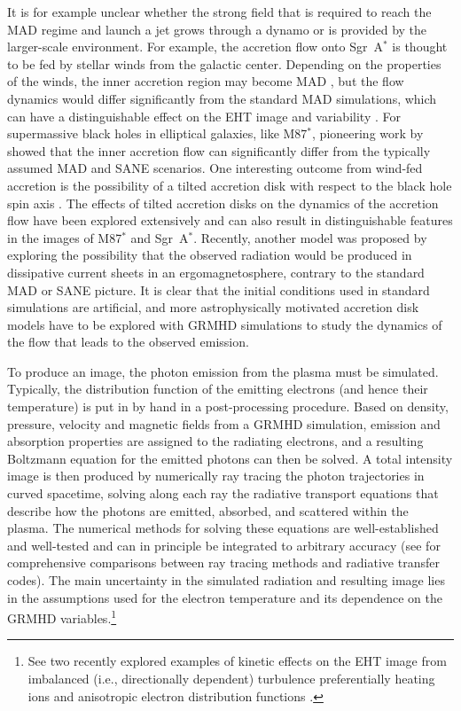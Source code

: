 \documentclass[graybox,envcountchap]{svmult}
\begin{document}
It is for example unclear whether the strong field that is required to reach the MAD regime and launch a jet grows through a dynamo \cite{Liska2020,JacqueminIde2023} or is provided by the larger-scale environment.
For example, the accretion flow onto Sgr~A$^*$ is thought to be fed by stellar winds from the galactic center.
Depending on the properties of the winds, the inner accretion region may become MAD \cite{Ressler2020}, but the flow dynamics would differ significantly from the standard MAD simulations, which can have a distinguishable effect on the EHT image and variability \cite{Jia2022,Murchikova2022}.
For supermassive black holes in elliptical galaxies, like M87$^*$, pioneering work by \cite{Guo2023} showed that the inner accretion flow can significantly differ from the typically assumed MAD and SANE scenarios.
One interesting outcome from wind-fed accretion is the possibility of a tilted accretion disk with respect to the black hole spin axis \cite{Ressler2023}.
The effects of tilted accretion disks on the dynamics of the accretion flow have been explored extensively \cite{Chatterjee2020,White2020,White2022,Chatterjee2023} and can also result in distinguishable features in the images of M87$^*$ and Sgr~A$^*$.
Recently, another model was proposed by \cite{Blandford2022} exploring the possibility that the observed radiation would be produced in dissipative current sheets in an ergomagnetosphere, contrary to the standard MAD or SANE picture.
It is clear that the initial conditions used in standard simulations are artificial, and more astrophysically motivated accretion disk models have to be explored with GRMHD simulations to study the dynamics of the flow that leads to the observed emission.

\bigskip

To produce an image, the photon emission from the plasma must be simulated.
Typically, the distribution function of the emitting electrons (and hence their temperature) is put in by hand in a post-processing procedure.
Based on density, pressure, velocity and magnetic fields from a GRMHD simulation, emission and absorption properties are assigned to the radiating electrons, and a resulting Boltzmann equation for the emitted photons can then be solved.
A total intensity image is then produced by numerically ray tracing the photon trajectories in curved spacetime, solving along each ray the radiative transport equations that describe how the photons are emitted, absorbed, and scattered within the plasma.
The numerical methods for solving these equations are well-established and well-tested and can in principle be integrated to arbitrary accuracy (see \cite{Bacchini2018,Gold2020,Prather2023} for comprehensive comparisons between ray tracing methods and radiative transfer codes).
The main uncertainty in the simulated radiation and resulting image lies in the assumptions used for the electron temperature and its dependence on the GRMHD variables.\footnote{See two recently explored examples of kinetic effects on the EHT image from imbalanced (i.e., directionally dependent) turbulence preferentially heating ions \cite{Wong2023} and anisotropic electron distribution functions \cite{Galishnikova2023b}.}
\end{document}
